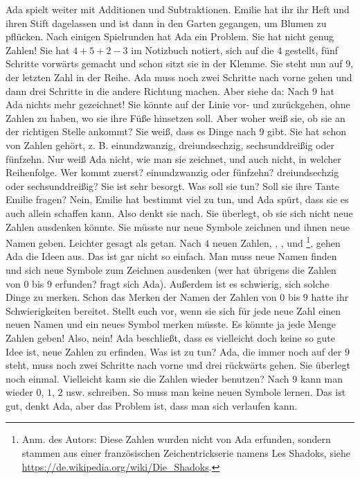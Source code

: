 Ada spielt weiter mit Additionen und Subtraktionen. 
Emilie hat ihr ihr Heft und ihren Stift dagelassen und ist dann in den Garten gegangen, um Blumen zu pflücken. 
Nach einigen Spielrunden hat Ada ein Problem. 
Sie hat nicht genug Zahlen! 
Sie hat $4 + 5 + 2 - 3$ im Notizbuch notiert, sich auf die $4$ gestellt, fünf Schritte vorwärts gemacht und schon sitzt sie in der Klemme. 
Sie steht nun auf $9$, der letzten Zahl in der Reihe. 
Ada muss noch zwei Schritte nach vorne gehen und dann drei Schritte in die andere Richtung machen.
Aber siehe da: Nach $9$ hat Ada nichts mehr gezeichnet!
Sie könnte auf der Linie vor- und zurückgehen, ohne Zahlen zu haben, wo sie ihre Füße hinsetzen soll. Aber woher weiß sie, ob sie an der richtigen Stelle ankommt? 
Sie weiß, dass es Dinge nach $9$ gibt. 
Sie hat schon von Zahlen gehört, z. B. einundzwanzig, dreiundsechzig, sechsunddreißig oder fünfzehn. 
Nur weiß Ada nicht, wie man sie zeichnet, und auch nicht, in welcher Reihenfolge.
Wer kommt zuerst? einundzwanzig oder fünfzehn? dreiundsechzig oder sechsunddreißig?
Sie ist sehr besorgt. Was soll sie tun? Soll sie ihre Tante Emilie fragen? Nein, Emilie hat bestimmt viel zu tun, und Ada spürt, dass sie es auch allein schaffen kann. Also denkt sie nach. Sie überlegt, ob sie sich nicht neue Zahlen ausdenken könnte. 
Sie müsste nur neue Symbole zeichnen und ihnen neue Namen geben. Leichter gesagt als getan. Nach $4$ neuen Zahlen, , ,  und \footnote{Anm. des Autors: Diese Zahlen wurden nicht von Ada erfunden, sondern stammen aus einer französischen Zeichentrickserie namens Les Shadoks, siehe \url{https://de.wikipedia.org/wiki/Die_Shadoks}.}, gehen Ada die Ideen aus. 
Das ist gar nicht so einfach. Man muss neue Namen finden und sich neue Symbole zum Zeichnen ausdenken (wer hat übrigens die Zahlen von $0$ bis $9$ erfunden? fragt sich Ada). Außerdem ist es schwierig, sich solche Dinge zu merken. Schon das Merken der Namen der Zahlen von $0$ bis $9$ hatte ihr Schwierigkeiten bereitet. Stellt euch vor, wenn sie sich für jede neue Zahl einen neuen Namen und ein neues Symbol merken müsste.
Es könnte ja jede Menge Zahlen geben! 
Also, nein! Ada beschließt, dass es vielleicht doch keine so gute Idee ist, neue Zahlen zu erfinden. 
Was ist zu tun? Ada, die immer noch auf der $9$ steht, muss noch zwei Schritte nach vorne und drei rückwärts gehen. Sie überlegt noch einmal. Vielleicht kann sie die Zahlen wieder benutzen? 
Nach $9$ kann man wieder $0$, $1$, $2$ usw. schreiben. So muss man keine neuen Symbole lernen. Das ist gut, denkt Ada, aber das Problem ist, dass man sich verlaufen kann. 
